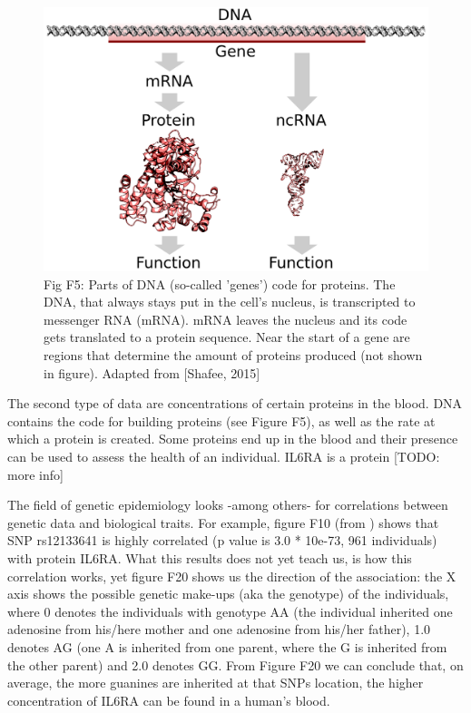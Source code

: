 \begin{figure}[!htbp]
  \centering
  \includegraphics[width=\linewidth]{DNA_to_protein_or_ncRNA.png}
  \caption{
    Fig F5: Parts of DNA (so-called 'genes') code for proteins. 
    The DNA, that always stays put in the cell's nucleus, 
    is transcripted to messenger RNA (mRNA).
    mRNA leaves the nucleus and its code gets translated to 
    a protein sequence.
    Near the start of a gene are regions that determine the amount
    of proteins produced (not shown in figure).
    Adapted from [Shafee, 2015]
  }
  \label{fig:dna_to_protein}
\end{figure}

The second type of data are concentrations of certain proteins in the 
blood. DNA contains the code for building proteins (see Figure F5), 
as well as the rate
at which a protein is created. Some proteins end up in the blood and
their presence can be used to assess the health of an individual.
IL6RA is a protein [TODO: more info]

The field of genetic epidemiology looks -among others- for
correlations between genetic data and biological traits.
For example, figure F10 (from \cite{ahsan2017relative}) shows that
SNP rs12133641 is highly correlated (p value is 3.0 * 10e-73, 
961 individuals) with protein IL6RA. What this results does
not yet teach us, is how this correlation works, yet
figure F20 shows us the direction of the association:
the X axis shows the possible genetic make-ups (aka the genotype) of the individuals,
where 0 denotes the individuals with genotype
AA (the individual inherited one adenosine 
from his/here mother and one adenosine from his/her father), 
1.0 denotes AG (one A is inherited from one parent, 
where the G is inherited from the other parent) and 2.0 denotes GG.
From Figure F20 we can conclude that, on average,
the more guanines are inherited at that SNPs location,
the higher concentration of IL6RA can be found in a human's blood.

